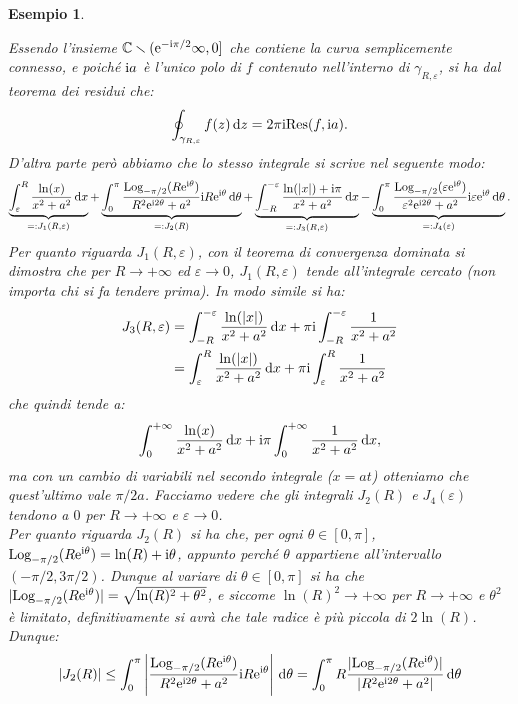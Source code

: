 \documentclass[11pt]{book}
\theoremstyle{Definizione}
\theoremstyle{TeoremaProposizioneLemmaCorollarioCongettura}
\theoremstyle{OsservazioneNotaEsempio}
\newtheorem{myes}{Esempio}[section]
\newcommand{\C}{\mathbb{C}}
\newcommand{\tolto}{\smallsetminus}
\renewcommand{\i}{\textup{i}}
\newcommand{\e}{\textup{e}}
\renewcommand{\d}{\mathrm{d}}
\newcommand{\dz}{\,\d z}
\newcommand{\dx}{\,\d x}
\newcommand{\dtheta}{\, \d \theta}
\newcommand{\Res}{\textup{Res}}
\newcommand{\Log}[1][]{\textup{Log}_{#1}}
\begin{document}
\begin{myes}
\begin{center}
\end{center}
Essendo l'insieme $\C \tolto (\e^{-\i\pi/2}\infty,0]$ che contiene la curva semplicemente connesso, e poiché $\i a$ è l'unico polo di $f$ contenuto nell'interno di $\gamma_{R,\varepsilon}$, si ha dal teorema dei residui che:
$$
\oint_{\gamma_{R,\varepsilon}} f(z) \dz = 2\pi\i \Res(f,\i a).
$$
D'altra parte però abbiamo che lo stesso integrale si scrive nel seguente modo:
$$
\underbrace{\int_{\varepsilon}^{R} \frac{\ln(x)}{x^2+a^2}\dx}_{=:J_1(R,\varepsilon)}+\underbrace{\int_{0}^{\pi} \frac{\Log[-\pi/2](R\e^{\i\theta})}{R^2\e^{\i2\theta}+a^2}\i R\e^{\i\theta}\dtheta}_{=: J_2(R)}+ \underbrace{\int_{-R}^{-\varepsilon} \frac{\ln(|x|)+\i\pi}{x^2+a^2}\dx}_{=:J_3(R,\varepsilon)}-\underbrace{\int_0^{\pi} \frac{\Log[-\pi/2](\varepsilon\e^{\i\theta})}{\varepsilon^2\e^{\i 2\theta}+a^2}\i\varepsilon\e^{\i\theta}\dtheta}_{=:J_4(\varepsilon)}.
$$
Per quanto riguarda $J_1(R,\varepsilon)$, con il teorema di convergenza dominata si dimostra che per $R \to +\infty$ ed $\varepsilon \to 0$, $J_1(R,\varepsilon)$ tende all'integrale cercato (non importa chi si fa tendere prima). In modo simile si ha:
\begin{align*}
J_3(R,\varepsilon) &= \int_{-R}^{-\varepsilon} \frac{\ln(|x|)}{x^2+a^2}\dx + \pi\i\int_{-R}^{-\varepsilon} \frac{1}{x^2+a^2}\\
&= \int_{\varepsilon}^{R} \frac{\ln(|x|)}{x^2+a^2}\dx + \pi\i\int_{\varepsilon}^{R} \frac{1}{x^2+a^2}
\end{align*}
che quindi tende a:
$$
\int_{0}^{+\infty} \frac{\ln(x)}{x^2+a^2}\dx + \i\pi \int_{0}^{+\infty} \frac{1}{x^2+a^2}\dx,
$$
ma con un cambio di variabili nel secondo integrale ($x = at$) otteniamo che quest'ultimo vale $\pi/2a$. Facciamo vedere che gli integrali $J_2(R)$ e $J_4(\varepsilon)$ tendono a $0$ per $R \to +\infty$ e $\varepsilon \to 0$.\\
Per quanto riguarda $J_2(R)$ si ha che, per ogni $\theta \in [0,\pi]$, $\Log[-\pi/2](R\e^{\i\theta}) = \ln(R)+\i\theta$, appunto perché $\theta$ appartiene all'intervallo $(-\pi/2,3\pi/2)$. Dunque al variare di $\theta \in [0,\pi]$ si ha che $|\Log[-\pi/2](R \e^{\i\theta}) | = \sqrt{\ln(R)^2+\theta^2}$, e siccome $\ln(R)^2 \to +\infty$ per $R \to +\infty$ e $\theta^2$ è limitato, definitivamente si avrà che tale radice è più piccola di $2\ln(R)$. Dunque:
\begin{align*}
|J_2(R)| &\leq \int_0^{\pi} \left|\frac{\Log[-\pi/2](R\e^{\i\theta})}{R^2\e^{\i2\theta}+a^2}\i R\e^{\i\theta}\right|\dtheta = \int_0^{\pi}R\frac{|\Log[-\pi/2](R\e^{\i\theta})|}{|R^2\e^{\i2\theta}+a^2|}\dtheta\\

\end{align*}
\end{myes}
\end{document}
